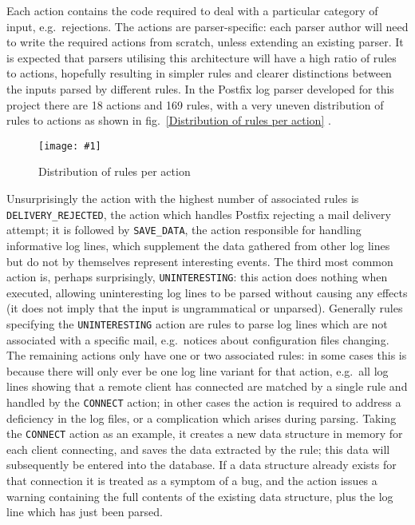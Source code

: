 \documentclass{svmult}
\newcommand{\showgraph}[3]{%
    \begin{figure}[btp]%
        \texttt{[image: \#1]}%
        \caption{#2}\label{#3}%
    \end{figure}%
}
\newcommand{\refwithlabel}[2]{%
    #1~\vref{#2}%
}
\newcommand{\graphref}[1]{%
    \refwithlabel{fig.}{#1}%
}
\newcommand{\numberOFrules}[0]{%
    169%
}
\newcommand{\numberOFactions}[0]{%
    18%
}
\begin{document}
Each action contains the code required to deal with a particular category
of input, e.g.\ rejections.  The actions are parser-specific: each parser
author will need to write the required actions from scratch, unless
extending an existing parser.  It is expected that parsers utilising this
architecture will have a high ratio of rules to actions, hopefully
resulting in simpler rules and clearer distinctions between the inputs
parsed by different rules.  In the Postfix log parser developed for this
project there are \numberOFactions{} actions and \numberOFrules{} rules,
with a very uneven distribution of rules to actions as shown in
\graphref{Distribution of rules per action}.
\showgraph{build/graph-action-distribution}{Distribution of rules per
action}{Distribution of rules per action} Unsurprisingly the action with
the highest number of associated rules is \texttt{DELIVERY\_REJECTED}, the
action which handles Postfix rejecting a mail delivery attempt; it is
followed by \texttt{SAVE\_DATA}, the action responsible for handling
informative log lines, which supplement the data gathered from other log
lines but do not by themselves represent interesting events.  The third
most common action is, perhaps surprisingly, \texttt{UNINTERESTING}: this
action does nothing when executed, allowing uninteresting log lines to be
parsed without causing any effects (it does not imply that the input is
ungrammatical or unparsed).  Generally rules specifying the
\texttt{UNINTERESTING} action are rules to parse log lines which are not
associated with a specific mail, e.g.\ notices about configuration files
changing.  The remaining actions only have one or two associated rules: in
some cases this is because there will only ever be one log line variant for
that action, e.g.\ all log lines showing that a remote client has connected
are matched by a single rule and handled by the \texttt{CONNECT} action; in
other cases the action is required to address a deficiency in the log
files, or a complication which arises during parsing.  Taking the
\texttt{CONNECT} action as an example, it creates a new data structure in
memory for each client connecting, and saves the data extracted by the
rule; this data will subsequently be entered into the database.  If a data
structure already exists for that connection it is treated as a symptom of
a bug, and the action issues a warning containing the full contents of the
existing data structure, plus the log line which has just been parsed.
\end{document}
